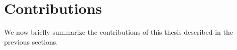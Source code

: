  
%
%
%
%
%
%
%
%
%
%
%
      
      
     
      
      
  \section{Contributions}
  
  We now briefly summarize the contributions of this thesis described
  in the previous sections.
  
